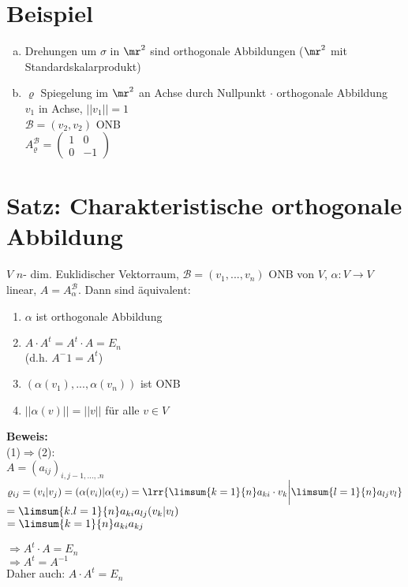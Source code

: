\section{Beispiel}
	\begin{enumerate}[a)]
		\item  Drehungen um $ \sigma $ in $ \mr^2 $ sind orthogonale Abbildungen ($ \mr^2 $ mit Standardskalarprodukt)
		\item  $ \varrho $ Spiegelung im $ \mr^2 $ an Achse durch Nullpunkt $ \cdot $ orthogonale Abbildung\\
		$ v_1 $ in Achse, $||v_1||=1$\\
		$ \mathcal{B}=(v_2,v_2) $ ONB\\
		$ A_\varrho^{\mathcal{B}}=\begin{pmatrix}
		1&0\\
		0&-1
		\end{pmatrix}$
	\end{enumerate}

\section{Satz: Charakteristische orthogonale Abbildung}
	$ V $ $ n $- dim. Euklidischer Vektorraum, $ \mathcal{B}=(v_1,...,v_n) $ ONB von $ V $, $ \alpha: V\rightarrow V $ linear, $ A=A_\alpha^{\mathcal{B}} $. Dann sind äquivalent:
	\begin{enumerate}[(1)]
		\item $ \alpha $ ist orthogonale Abbildung
		\item  $ A\cdot A^t=A^t\cdot A=E_n $\\
		(d.h. $ A^-1=A^t $)
		\item  $ (\alpha(v_1),...,\alpha(v_n)) $ ist ONB
		\item $ ||\alpha(v)||=||v|| $ für alle $ v\in V $
	\end{enumerate}

	\textbf{Beweis:}\\
	(1)$ \Rightarrow $(2):\\
	$ A=(a_{ij})_{i,j-1,...,.n} $\\
	$ \varrho_{ij}=(v_i|v_j)=(\alpha(v_i)|\alpha(v_j)=\lrr{\limsum{k=1}{n}a_{ki}\cdot v_k\bigg|\limsum{l=1}{n}a_{lj}v_l} $\\
	$ =\limsum{k.l=1}{n}a_{ki}a_{lj}(v_k|v_l) $\\
	$ =\limsum{k=1}{n}a_{ki}a_{kj} $
	
	$ \Rightarrow A^t\cdot A=E_n $\\
	$ \Rightarrow A^t=A^{-1} $\\
	Daher auch: $ A\cdot A^t=E_n $
	
